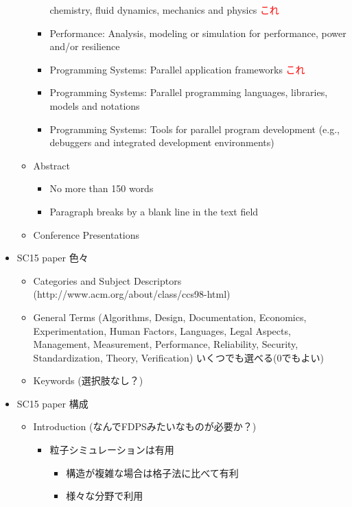 \documentclass[12pt,a4paper]{jarticle}
\newcommand{\redtext}[1]{\textcolor{red}{#1}}
\begin{document}
\begin{itemize}
\begin{itemize}
\begin{itemize}
      chemistry, fluid dynamics, mechanics and physics \redtext{これ}
    \item Performance: Analysis, modeling or simulation for
      performance, power and/or resilience
    \item Programming Systems: Parallel application frameworks
      \redtext{これ}
    \item Programming Systems: Parallel programming languages,
      libraries, models and notations
    \item Programming Systems: Tools for parallel program development
      (e.g., debuggers and integrated development environments)
    \end{itemize}
  \item Abstract
    \begin{itemize}
    \item No more than 150 words
    \item Paragraph breaks by a blank line in the text field
    \end{itemize}
  \item Conference Presentations
  \end{itemize}
\item SC15 paper 色々
  \begin{itemize}
  \item Categories and Subject Descriptors
    (http://www.acm.org/about/class/ccs98-html)
  \item General Terms (Algorithms, Design, Documentation, Economics,
    Experimentation, Human Factors, Languages, Legal Aspects,
    Management, Measurement, Performance, Reliability, Security,
    Standardization, Theory, Verification) いくつでも選べる(0でもよい)
  \item Keywords (選択肢なし？)
  \end{itemize}
\item SC15 paper 構成
  \begin{itemize}
  \item Introduction (なんでFDPSみたいなものが必要か？)
    \begin{itemize}
    \item 粒子シミュレーションは有用
      \begin{itemize}
      \item 構造が複雑な場合は格子法に比べて有利
      \item 様々な分野で利用
      \end{itemize}

\end{itemize}
\end{itemize}
\end{itemize}
\end{document}
